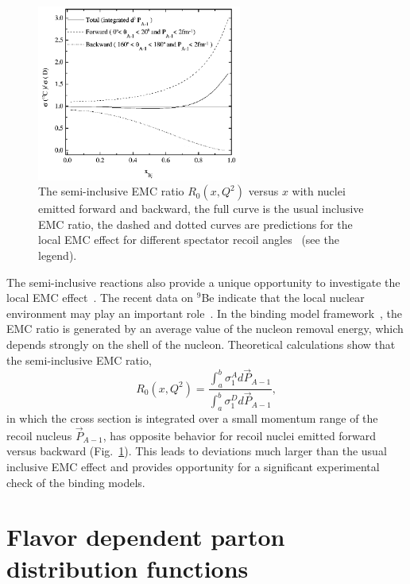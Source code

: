 \begin{figure}
  \begin{center}
    \includegraphics[angle=0, width=0.6\textwidth]{./fig-chap1/ratio_0}
    \caption{The semi-inclusive EMC ratio $R_0(x,Q^2)$ versus $x$ with nuclei emitted forward and backward, the full curve is the usual inclusive EMC ratio, the dashed and dotted curves are predictions for the local EMC effect for different spectator recoil angles~\cite{CiofidegliAtti1999} (see the legend).}
    \label{fig:r0}
  \end{center}
\end{figure}

The semi-inclusive reactions also provide a unique opportunity to investigate the local EMC effect~\cite{Kumano1990,ciofiliuti1991,CiofidegliAtti1999}. The recent data on $^9$Be indicate that the local nuclear environment may play an important role~\cite{Seely2009}. In the binding model framework~\cite{frankfurt1988}, the EMC ratio is generated by an average value of the nucleon removal energy, which depends strongly on the shell of the nucleon. Theoretical calculations show that the semi-inclusive EMC ratio,
\begin{equation}
R_0 (x,Q^2) =\frac{\int_a^b\sigma_1^Ad\vec P_{A-1}}{\int_a^b\sigma_1^Dd\vec P_{A-1}},
\label{eq:semi_emc}
\end{equation}
in which the cross section is integrated over a small momentum range of the recoil nucleus $\vec P_{A-1}$, has opposite behavior for recoil nuclei emitted forward versus backward (Fig.~\ref{fig:r0}). This leads to deviations much larger than the usual inclusive EMC effect and provides opportunity for a significant experimental check of the binding models.

\section{Flavor dependent parton distribution functions}

